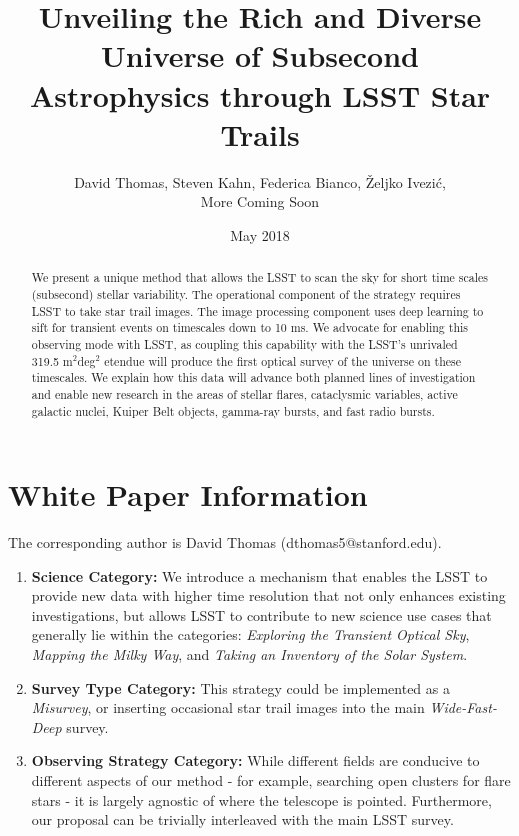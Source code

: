 \documentclass[12pt, letterpaper]{article}
\title{Unveiling the Rich and Diverse Universe of Subsecond Astrophysics through LSST Star Trails}
\author{David Thomas, Steven Kahn, Federica Bianco, Željko Ivezić, \\{\color{green}More Coming Soon}}
\date{May 2018}
\begin{document}
\maketitle

\begin{abstract}
We present a unique method that allows the LSST to scan the sky for short time scales (subsecond) stellar variability.
The operational component of the strategy requires LSST to take star trail images. The image processing component uses deep learning to sift for transient events on timescales down to 10 ms. We advocate for enabling this observing mode with LSST, as coupling this capability with the LSST's unrivaled 319.5 m$^2$deg$^2$ etendue will produce the first optical survey of the universe on these timescales. We explain how this data will advance both planned lines of investigation and enable new research in the areas of stellar flares, cataclysmic variables, active galactic nuclei, Kuiper Belt objects, gamma-ray bursts, and fast radio bursts.
\end{abstract}

\section{White Paper Information}
The corresponding author is David Thomas (dthomas5@stanford.edu).

\begin{enumerate} 
\item {\bf Science Category:} We introduce a mechanism that enables the LSST to provide new data with higher time resolution that not only enhances existing investigations, but allows LSST to contribute to new science use cases that generally lie within the categories: \textit{Exploring the Transient Optical Sky}, \textit{Mapping the Milky Way}, and \textit{Taking an Inventory of the Solar System}.

\item {\bf Survey Type Category:} This strategy could be implemented as a \emph{Misurvey}, or inserting occasional star trail images into the main \textit{Wide-Fast-Deep} survey.

\item {\bf Observing Strategy Category:}
While different fields are conducive to different aspects of our method - for example, searching open clusters for flare stars - it is largely agnostic of where the telescope is pointed. Furthermore, our proposal can be trivially interleaved with the main LSST survey.

\end{enumerate}  
\end{document}
